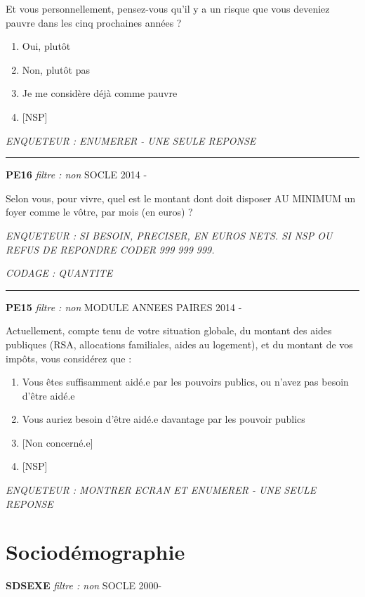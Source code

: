 \documentclass[12pt,a4paper]{reedthesis}
\providecommand{\tightlist}{%
  \setlength{\itemsep}{0pt}\setlength{\parskip}{0pt}}
\begin{document}
Et vous personnellement, pensez-vous qu'il y a un risque que vous deveniez pauvre dans les cinq prochaines années ?
\begin{enumerate}
\def\labelenumi{\arabic{enumi}.}
\tightlist
\item
  Oui, plutôt
\item
  Non, plutôt pas
\item
  Je me considère déjà comme pauvre
\item
  {[}NSP{]}
\end{enumerate}
\emph{ENQUETEUR : ENUMERER - UNE SEULE REPONSE}
\begin{center}\rule{0.5\linewidth}{0.5pt}\end{center}

\textbf{PE16} \emph{filtre : non} SOCLE 2014 -

Selon vous, pour vivre, quel est le montant dont doit disposer AU MINIMUM un foyer comme le vôtre, par mois (en euros) ?

\emph{ENQUETEUR : SI BESOIN, PRECISER, EN EUROS NETS. SI NSP OU REFUS DE REPONDRE CODER 999 999 999.}

\emph{CODAGE : QUANTITE}
\begin{center}\rule{0.5\linewidth}{0.5pt}\end{center}

\textbf{PE15} \emph{filtre : non} MODULE ANNEES PAIRES 2014 -

Actuellement, compte tenu de votre situation globale, du montant des aides publiques (RSA, allocations familiales, aides au logement), et du montant de vos impôts, vous considérez que :
\begin{enumerate}
\def\labelenumi{\arabic{enumi}.}
\tightlist
\item
  Vous êtes suffisamment aidé.e par les pouvoirs publics, ou n'avez pas besoin d'être aidé.e
\item
  Vous auriez besoin d'être aidé.e davantage par les pouvoir publics
\item
  {[}Non concerné.e{]}
\item
  {[}NSP{]}
\end{enumerate}
\emph{ENQUETEUR : MONTRER ECRAN ET ENUMERER - UNE SEULE REPONSE}

\hypertarget{socioduxe9mographie}{%
\section{Sociodémographie}\label{socioduxe9mographie}}

\textbf{SDSEXE} \emph{filtre : non} SOCLE 2000-
\end{document}
